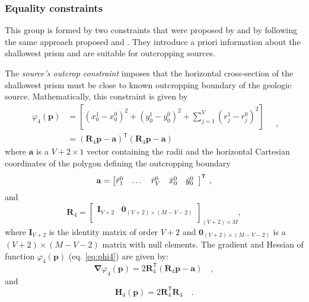 \subsubsection{Equality constraints}

This group is formed by two constraints that were proposed by \cite{oliveirajr-etal2011} and \cite{oliveirajr-barbosa2013} by following the same approach proposed \cite{barbosa-etal1997} and 
\cite{barbosa-1999a}. They introduce a priori information about the shallowest prism and are  suitable for outcropping sources.

The \textit{source’s outcrop constraint} imposes that the horizontal cross-section of the shallowest prism 
must be close to known outcropping boundary of the geologic source. Mathematically, this constraint is given by
\begin{equation}\label{eq:phi4}
\begin{split}
\varphi_{4}(\mathbf{p}) &= \left[\left(x_{0}^{1} - x_{0}^{0}\right)^2 + \left(y_{0}^{1} - y_{0}^{0}\right)^2 + \sum\limits^{V}_{j=1}\left(r^{1}_{j}-r^{0}_{j}\right)^2\right] \\
&= \left(\mathbf{R}_{4} \mathbf{p} - \mathbf{a} \right)^{\mathsf{T}} 
\left(\mathbf{R}_{4} \mathbf{p} - \mathbf{a} \right)
\end{split} \quad ,
\end{equation}
where $\mathbf{a}$ is a $V+2 \times 1$ vector containing the radii and the horizontal Cartesian coordinates of the 
polygon defining the outcropping boundary
\begin{equation}
\mathbf{a} = \left[ \begin{array}{@{}*{12}{c}@{}}
\tilde{r}_{1}^{0} & \dots & \tilde{r}_{V}^{0} & \tilde{x}_{0}^{0} & \tilde{y}_{0}^{0} \\
\end{array} \right]^{\mathsf{T}} \: ,
\label{eq:a-vector}
\end{equation}
and
\begin{equation}
\mathbf{R}_{4} = 
\begin{bmatrix}
\mathbf{I}_{V+2} & \mathbf{0}_{(V+2) \times (M-V-2)} \\
\end{bmatrix}_{(V+2)\times M},
\label{eq:R4-matrix}
\end{equation}
where $\mathbf{I}_{V+2}$ is the identity matrix of order $V+2$ and 
$\mathbf{0}_{(V+2) \times (M-V-2)}$ is a $(V+2) \times (M-V-2)$ matrix 
with null elements. The gradient and Hessian of function $\varphi_{4}(\mathbf{p})$ (eq. \ref{eq:phi4}) are given by:
\begin{equation}\label{eq:phi4_grad}
\boldsymbol{\nabla}\varphi_{4}(\mathbf{p}) = 2 \mathbf{R}_{4}^{\mathsf{T}} 
\left(\mathbf{R}_{4} \mathbf{p} - \mathbf{a} \right) \quad ,
\end{equation}
and
\begin{equation}\label{eq:phi4_hessian}
\mathbf{H}_{4}(\mathbf{p}) = 2 \mathbf{R}^{\mathsf{T}}_{4}\mathbf{R}_{4} \quad .
\end{equation}

